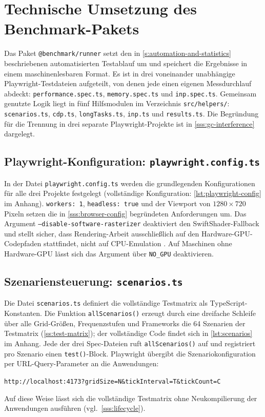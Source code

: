 \section{Technische Umsetzung des Benchmark-Pakets}
\label{s:impl-benchmark}

Das Paket \texttt{@benchmark/runner} setzt den in \cref{s:automation-and-statistics} beschriebenen automatisierten Testablauf um und speichert die Ergebnisse in einem maschinenlesbaren Format. Es ist in drei voneinander unabhängige Playwright-Testdateien aufgeteilt, von denen jede einen eigenen Messdurchlauf abdeckt: \texttt{performance.spec.ts}, \texttt{memory.spec.ts} und \texttt{inp.spec.ts}. Gemeinsam genutzte Logik liegt in fünf Hilfsmodulen im Verzeichnis \texttt{src/helpers/}: \texttt{scenarios.ts}, \texttt{cdp.ts}, \texttt{longTasks.ts}, \texttt{inp.ts} und \texttt{results.ts}. Die Begründung für die Trennung in drei separate Playwright-Projekte ist in \cref{sss:gc-interference} dargelegt.

\subsection{Playwright-Konfiguration: \texttt{playwright.config.ts}}
\label{ss:impl-playwright-config}

In der Datei \texttt{playwright.config.ts} werden die grundlegenden Konfigurationen für alle drei Projekte festgelegt (vollständige Konfiguration: \cref{lst:playwright-config} im Anhang). \texttt{workers: 1}, \texttt{headless: true} und der Viewport von $1280 \times 720$ Pixeln setzen die in \cref{sss:browser-config} begründeten Anforderungen um. Das Argument \texttt{--disable-software-rasterizer} deaktiviert den SwiftShader-Fallback und stellt sicher, dass Rendering-Arbeit ausschließlich auf den Hardware-GPU-Codepfaden stattfindet, nicht auf CPU-Emulation \cite{chromium-swiftshader}. Auf Maschinen ohne Hardware-GPU lässt sich das Argument über \texttt{NO\_GPU} deaktivieren.

\subsection{Szenariensteuerung: \texttt{scenarios.ts}}
\label{ss:impl-scenarios}

Die Datei \texttt{scenarios.ts} definiert die vollständige Testmatrix als TypeScript-Konstanten. Die Funktion \texttt{allScenarios()} erzeugt durch eine dreifache Schleife über alle Grid-Größen, Frequenzstufen und Frameworks die 64 Szenarien der Testmatrix (\cref{ss:test-matrix}); der vollständige Code findet sich in \cref{lst:scenarios} im Anhang. Jede der drei Spec-Dateien ruft \texttt{allScenarios()} auf und registriert pro Szenario einen \texttt{test()}-Block. Playwright übergibt die Szenariokonfiguration per URL-Query-Parameter an die Anwendungen:
\begin{center}
  \texttt{http://localhost:4173?gridSize=N\&tickInterval=T\&tickCount=C}
\end{center}
Auf diese Weise lässt sich die vollständige Testmatrix ohne Neukompilierung der Anwendungen ausführen (vgl.~\cref{sss:lifecycle}).

